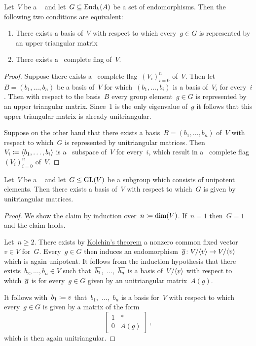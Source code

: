 \begin{lemma}
  Let~$V$ be a {\fd}~{\kvs} and let~$G \subseteq \operatorname{End}_k(A)$ be a set of endomorphisms. 
  Then the following two conditions are equivalent:
  \begin{enumerate}
    \item 
      There exists a basis of~$V$ with respect to which every~$g \in G$ is represented by an upper triangular matrix 
    \item
      There exists a~ complete flag of~$V$.
  \end{enumerate} 
\end{lemma}


\begin{proof}
  Suppose there exists a~ complete flag~$(V_i)_{i=0}^n$ of~$V$.
  Then let~$B = (b_1, \dotsc, b_n)$ be a basis of~$V$ for which~$(b_1, \dotsc, b_i)$ is a basis of~$V_i$ for every~$i$.
  Then with respect to the basis~$B$ every group element~$g \in G$ is represented by an upper triangular matrix.
  Since~$1$ is the only eigenvalue of~$g$ it follows that this upper triangular matrix is already unitriangular.
  
  Suppose on the other hand that there exists a basis~$B = (b_1, \dotsc, b_n)$ of~$V$ with respect to which~$G$ is represented by unitriangular matrices.
  Then~$V_i \coloneqq \langle b_1, \dotsc, b_i\rangle$ is a~ subspace of~$V$ for every~$i$, which result in a~ complete flag~$(V_i)_{i=0}^n$ of~$V$.
\end{proof}


\begin{corollary}[Kolchin]
  \label{kolchin triang}
  Let~$V$ be a {\fd}~{\kvs} and let~$G \leq \operatorname{GL}(V)$ be a subgroup which consists of unipotent elements.
  Then there exists a basis of~$V$ with respect to which~$G$ is given by unitriangular matrices.
\end{corollary}


\begin{proof}
  We show the claim by induction over~$n \coloneqq \dim(V)$.
  If~$n = 1$ then~$G = 1$ and the claim holds.
  
  Let~$n \geq 2$.
  There exists by \hyperref[kolchin fixed vector]{Kolchin’s theorem} a nonzero common fixed vector~$v \in V$ for~$G$.
  Every~$g \in G$ then induces an endomorphism~$\overline{g} \colon V/\langle v\rangle \to V/\langle v\rangle$ which is again unipotent.
  It follows from the induction hypothesis that there exists~$b_2, \dotsc, b_n \in V$ such that~$\overline{b_1}$,~$\dotsc$,~$\overline{b_n}$ is a basis of~$V/\langle v\rangle$ with respect to which~$\overline{g}$ is for every~$g \in G$ given by an unitriangular matrix~$A(g)$.
  
  It follows with~$b_1 \coloneqq v$ that~$b_1$,~$\dotsc$,~$b_n$ is a basis for~$V$ with respect to which every~$g \in G$ is given by a matrix of the form
  \[
    \begin{bmatrix}
      1 & *     \\
      0 & A(g)
    \end{bmatrix} \,,
  \]
  which is then again unitriangular.
\end{proof}



